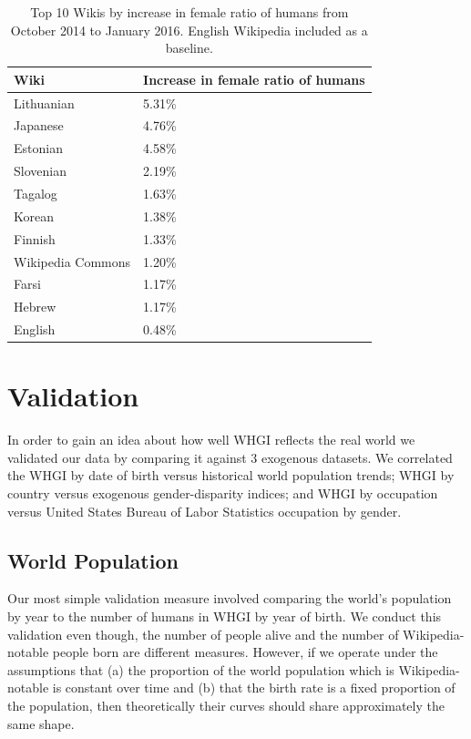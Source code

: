 \documentclass[letterpaper]{article}
\begin{document}
\begin{table}
\caption{Top 10 Wikis by increase in female ratio of humans from October 2014 to January 2016. English Wikipedia included as a baseline.}
\label{table:top10}
\begin{tabular}{p{2cm}p{2cm}}
\toprule
{Wiki} &     Increase in female ratio of humans  \\
\midrule
Lithuanian      & 5.31\% \\
Japanese     & 4.76\% \\
Estonian      & 4.58\% \\
Slovenian      & 2.19\% \\
Tagalog      & 1.63\% \\
Korean      & 1.38\% \\
Finnish      & 1.33\% \\
Wikipedia Commons & 1.20\% \\
Farsi      & 1.17\% \\
Hebrew      & 1.17\% \\
English      & 0.48\% \\
\bottomrule
\end{tabular}
\end{table}

\section{Validation}
In order to gain an idea about how well WHGI reflects the real world we validated our data by comparing it against 3 exogenous datasets. We correlated the WHGI by date of birth versus historical world population trends; WHGI by country versus exogenous gender-disparity indices; and WHGI by occupation versus United States Bureau of Labor Statistics occupation by gender.

\subsection{World Population} Our most simple validation measure involved comparing the world's population by year to the number of humans in WHGI by year of birth. We conduct this validation even though, the number of people alive and the number of Wikipedia-notable people born are different measures. However, if we operate under the assumptions that (a) the proportion of the world population which is Wikipedia-notable is constant over time and (b) that the birth rate is a fixed proportion of the population, then theoretically their curves should share approximately the same shape.
\end{document}
